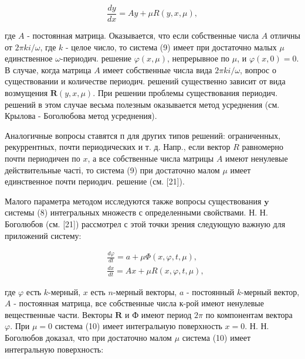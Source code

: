 \documentclass[10pt]{article}
\begin{document}
\[

\frac{d y}{d x}=A y+\mu R(y, x, \mu),

\]



где $A$ - постоянная матрица. Оказывается, что если собственные числа $A$ отличны от $2 \pi k i / \omega$, где $k$ - целое число, то система (9) имеет при достаточно малых $\mu$ единственное $\omega$-периодич. решение $\varphi(x, \mu)$, непрерывное по $\mu$, и $\varphi(x, 0)=0$. В случае, когда матрица $A$ имеет собственные числа вида $2 \pi k i / \omega$, вопрос о существовании и количестве периодич. решений существенно зависит от вида возмущения $\boldsymbol{R}(y, x, \mu)$. При решении проблемы существования периодич. решений в этом случае весьма полезным оказывается метод усреднения (см. Крылова - Боголюбова метод усреднения).



Аналогичные вопросы ставятся п для других типов решений: ограниченных, рекуррентных, почти периодических и т. д. Напр., если вектор $R$ равномерно почти периодичен по $x$, а все собственные числа матрицы $A$ имеют ненулевые действительные часті, то система (9) при достаточно малом $\mu$ имеет единственное почти периодич. решение (см. [21]).



Малого параметра методом исследуются также вопросы существования $\mathbf{y}$ системы (8) интегральных множеств с определенными свойствами. Н. Н. Боголюбов (см. [21]) рассмотрел с этой точки зрения следующую важную для приложений систему:



\[

\begin{aligned}

& \frac{d \varphi}{d t}=a+\mu \Phi(x, \varphi, t, \mu), \\

& \frac{d x}{d t}=A x+\mu R(x, \varphi, t, \mu),

\end{aligned}

\]



где $\varphi$ есть $k$-мерный, $x$ есть $n$-мерный векторы, $a$ - постоянный $k$-мерный вектор, $A$ - постоянная матрица, все собственные числа к-рой имеют ненулевые вещественные части. Векторы $\boldsymbol{R}$ и Ф имеют период $2 \pi$ по компонентам вектора $\varphi$. При $\mu=0$ система (10) имеет интегральную поверхность $x=0$. Н. Н. Боголюбов доказал, что при достаточно малом $\mu$ система (10) имеет интегральную поверхность:
\end{document}
